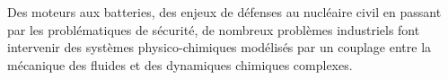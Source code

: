 Des moteurs aux batteries, des enjeux de défenses au nucléaire civil en passant par les problématiques de sécurité, de nombreux problèmes industriels 
font intervenir des systèmes physico-chimiques modélisés par un couplage entre la mécanique des fluides et des dynamiques chimiques complexes.
